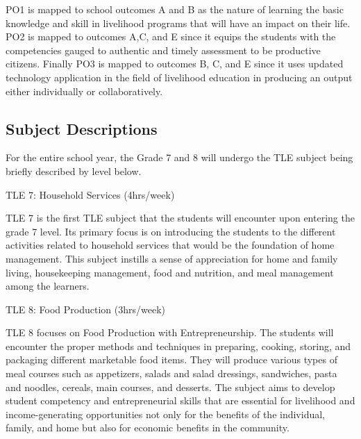 PO1 is mapped to school outcomes A and B as the nature of learning the basic knowledge and skill in livelihood programs that will have an impact on their life. PO2 is mapped to outcomes A,C, and E since it equips the students with the competencies gauged to authentic and timely assessment to be productive citizens. Finally PO3 is mapped to outcomes B, C, and E since it uses updated technology application in the field of livelihood education in producing an output either individually or collaboratively.

\subsection{Subject Descriptions}
For the entire school year, the Grade 7 and 8 will undergo the TLE subject being briefly described by level below. 

\begin{subject}
	TLE 7: Household Services
	\hfill
	(4hrs/week)
\end{subject}
TLE 7 is the first TLE subject that the students will encounter upon entering the grade 7 level. Its primary focus is on introducing the students to the different activities related to household services that would be the foundation of home management. This subject instills a sense of appreciation for home and family living, housekeeping management, food and nutrition, and meal management among the learners.

\begin{subject}
	TLE 8: Food Production 
	\hfill
	(3hrs/week)
\end{subject}
TLE 8 focuses on Food Production with Entrepreneurship. The students will encounter the proper methods and techniques in preparing, cooking, storing, and packaging different marketable food items. They will produce various types of meal courses such as appetizers, salads and salad dressings, sandwiches, pasta and noodles, cereals, main courses, and desserts. The subject aims to develop student competency and entrepreneurial skills that are essential for livelihood and income-generating opportunities not only for the benefits of the individual, family, and home but also for economic benefits in the community.


